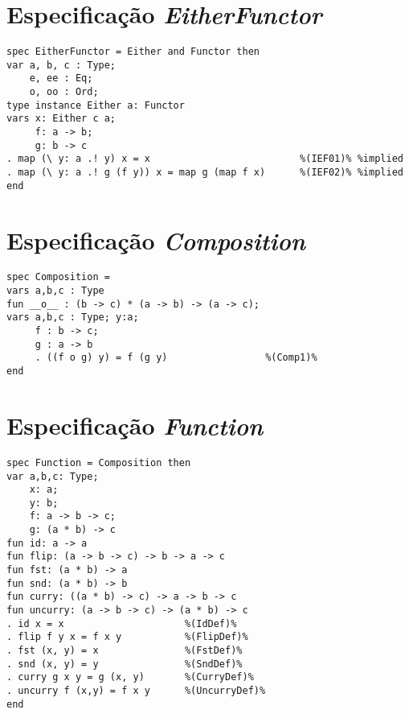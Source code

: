 \section{Especificação \textit{EitherFunctor}}
\label{appendix:strictSpec:eitherFunctor}
\begin{Verbatim}
spec EitherFunctor = Either and Functor then
var a, b, c : Type;
    e, ee : Eq;
    o, oo : Ord;
type instance Either a: Functor
vars x: Either c a;  
     f: a -> b;
     g: b -> c
. map (\ y: a .! y) x = x                          %(IEF01)% %implied
. map (\ y: a .! g (f y)) x = map g (map f x)      %(IEF02)% %implied
end
\end{Verbatim}

\section{Especificação \textit{Composition}}
\label{appendix:strictSpec:composition}
\begin{Verbatim}
spec Composition =
vars a,b,c : Type
fun __o__ : (b -> c) * (a -> b) -> (a -> c);
vars a,b,c : Type; y:a;
     f : b -> c; 
     g : a -> b
     . ((f o g) y) = f (g y)                 %(Comp1)%
end
\end{Verbatim}

\section{Especificação \textit{Function}}
\label{appendix:strictSpec:function}
\begin{Verbatim}
spec Function = Composition then
var a,b,c: Type;
    x: a;
    y: b;   
    f: a -> b -> c;
    g: (a * b) -> c
fun id: a -> a
fun flip: (a -> b -> c) -> b -> a -> c
fun fst: (a * b) -> a
fun snd: (a * b) -> b
fun curry: ((a * b) -> c) -> a -> b -> c
fun uncurry: (a -> b -> c) -> (a * b) -> c
. id x = x                     %(IdDef)%
. flip f y x = f x y           %(FlipDef)%
. fst (x, y) = x               %(FstDef)%
. snd (x, y) = y               %(SndDef)%
. curry g x y = g (x, y)       %(CurryDef)%
. uncurry f (x,y) = f x y      %(UncurryDef)%
end
\end{Verbatim}

